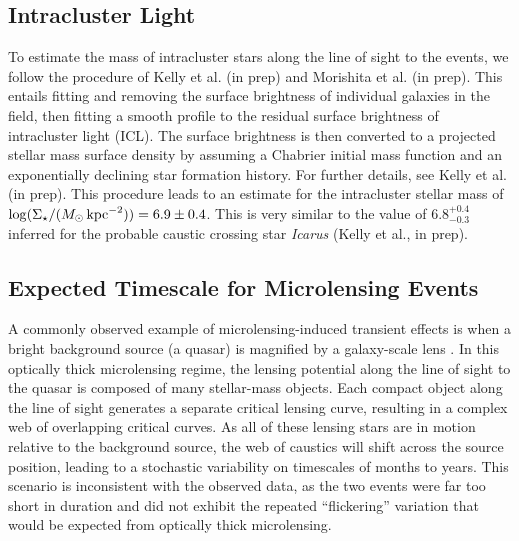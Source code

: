 \subsection{Intracluster Light}\label{sec:ICL}

To estimate the mass of intracluster stars along the line of sight to
the \spock events, we follow the procedure of Kelly et al. (in prep)
and Morishita et al. (in prep).  This entails fitting and removing the
surface brightness of individual galaxies in the field, then fitting a
smooth profile to the residual surface brightness of intracluster
light (ICL).  The surface brightness is then converted to a projected
stellar mass surface density by assuming a Chabrier
\citeyear{Chabrier:2003} initial mass function and an exponentially
declining star formation history.  For further details, see Kelly et
al. (in prep).  This procedure leads to an estimate for the
intracluster stellar mass of
$\log (\Sigma_{\star} / (M_{\odot}\,{\rm kpc}^{-2})) = 6.9\pm0.4$.
This is very similar to the value of $6.8^{+0.4}_{-0.3}$ inferred for
the probable caustic crossing star {\it Icarus} (Kelly et al., in
prep).


\subsection{Expected Timescale for Microlensing Events}\label{sec:Microlensing}

A commonly observed example of microlensing-induced transient effects
is when a bright background source (a quasar) is magnified by a
galaxy-scale lens \citep{Wambsganss:2001, Kochanek:2004}.  In this
optically thick microlensing regime, the lensing potential along the
line of sight to the quasar is composed of many stellar-mass objects.
Each compact object along the line of sight generates a separate
critical lensing curve, resulting in a complex web of overlapping
critical curves. As all of these lensing stars are in motion relative
to the background source, the web of caustics will shift across the
source position, leading to a stochastic variability on timescales of
months to years.  This scenario is inconsistent with the observed
data, as the two \spock events were far too short in duration and did
not exhibit the repeated ``flickering'' variation that would be
expected from optically thick microlensing.

